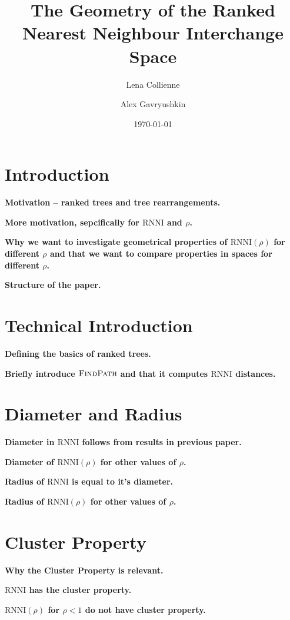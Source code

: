 \documentclass[11pt]{amsart}
\title[Geometry of ranked tree spaces]{The Geometry of the Ranked Nearest Neighbour Interchange Space}
\date{\today}
\author{Lena Collienne}
\author{Alex Gavryushkin\textsuperscript{\Letter}}
\newcommand{\rnni}{\mathrm{RNNI}}
\newcommand{\findpath}{\textsc{FindPath}}
\newcommand{\summary}[1]{\textbf{#1}} %
\begin{document}
\maketitle

\begin{abstract}
\end{abstract}

\section{Introduction}

\summary{Motivation -- ranked trees and tree rearrangements.}

\summary{More motivation, sepcifically for $\rnni$ and $\rho$.}

\summary{Why we want to investigate geometrical properties of $\rnni(\rho)$ for different $\rho$ and that we want to compare properties in spaces for different $\rho$.}

\summary{Structure of the paper.}

\section{Technical Introduction}

\summary{Defining the basics of ranked trees.}

\summary{Briefly introduce $\findpath$ and that it computes $\rnni$ distances.}

\section{Diameter and Radius}

\summary{Diameter in $\rnni$ follows from results in previous paper.}

\summary{Diameter of $\rnni(\rho)$ for other values of $\rho$.}

\summary{Radius of $\rnni$ is equal to it's diameter.}

\summary{Radius of $\rnni(\rho)$ for other values of $\rho$.}

\section{Cluster Property}

\summary{Why the Cluster Property is relevant.}

\summary{$\rnni$ has the cluster property.}

\summary{$\rnni(\rho)$ for $\rho < 1$ do not have cluster property.}
\end{document}
